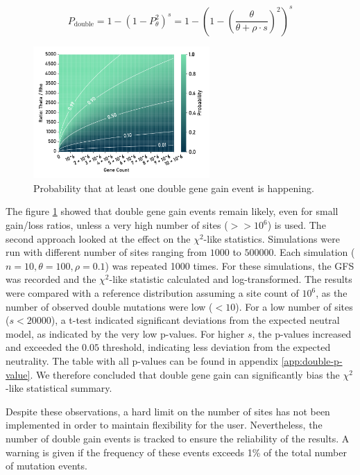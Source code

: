 \begin{equation}
    P_{\text{double}} = 1-(1-P_\theta^2)^s =  1-(1-(\frac{\theta}{\theta + \rho \cdot s})^2)^s
\end{equation}

\begin{figure}[h]
    \centering
    \includegraphics[width=0.6\textwidth]{figures/double_proba.pdf}
    \caption[Probability of double gene gain events.]{Probability that at least one double gene gain event is happening.}
    \label{fig:double-proba}
\end{figure}

The figure \ref{fig:double-proba} showed that double gene gain events remain likely, even for small gain/loss ratios, unless a very high number of sites ($>> 10^6$) is used.
The second approach looked at the effect on the $\chi^2$-like statistics.
Simulations were run with different number of sites ranging from $1000$ to $500000$.
Each simulation ($n = 10, \theta = 100, \rho = 0.1$) was repeated 1000 times.
For these simulations, the \ac{GFS} was recorded and the $\chi^2$-like statistic calculated and log-transformed.
The results were compared with a reference distribution assuming a site count of $10^6$, as the number of observed double mutations were low ($< 10$).
For a low number of sites ($s < 20000$), a t-test indicated significant deviations from the expected neutral model, as indicated by the very low p-values.
For higher $s$, the p-values increased and exceeded the $0.05$ threshold, indicating less deviation from the expected neutrality.
The table with all p-values can be found in appendix \ref{app:double-p-value}.
We therefore concluded that double gene gain can significantly bias the $\chi^2$-like statistical summary.


Despite these observations, a hard limit on the number of sites has not been implemented in order to maintain flexibility for the user.
Nevertheless, the number of double gain events is tracked to ensure the reliability of the results.
A warning is given if the frequency of these events exceeds 1\% of the total number of mutation events.

